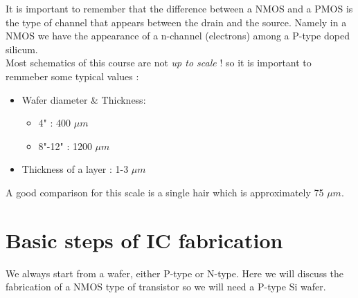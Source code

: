 \documentclass{report}
\begin{document}
It is important to remember that the difference between a NMOS and a PMOS is the type of channel that appears between the drain and the source. Namely in a NMOS we have the appearance of a n-channel (electrons) among a P-type doped silicum.\\

Most schematics of this course are not \textit{up to scale} ! so it is important to remmeber some typical values : 

\begin{itemize}
    \item Wafer diameter \& Thickness:
    \begin{itemize}
        \item 4" : 400 $\mu m$
        \item 8"-12" : 1200 $\mu m$
    \end{itemize}
    \item Thickness of a layer : 1-3 $\mu m$
\end{itemize}

A good comparison for this scale is a single hair which is approximately 75 $\mu m$.

\section{Basic steps of IC fabrication}

We always start from a wafer, either P-type or N-type. Here we will discuss the fabrication of a NMOS type of transistor so we will need a P-type Si wafer.
\end{document}
